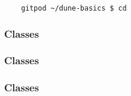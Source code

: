 





\begin{frame}[fragile]
	\begin{lstlisting}
    gitpod ~/dune-basics $ cd
  \end{lstlisting}
\end{frame}


\begin{frame}[fragile]
	\frametitle{Classes}

	


\end{frame}

\begin{frame}[fragile]
	\frametitle{Classes}

	

\end{frame}

\begin{frame}[fragile]
	\frametitle{Classes}

	

\end{frame}

